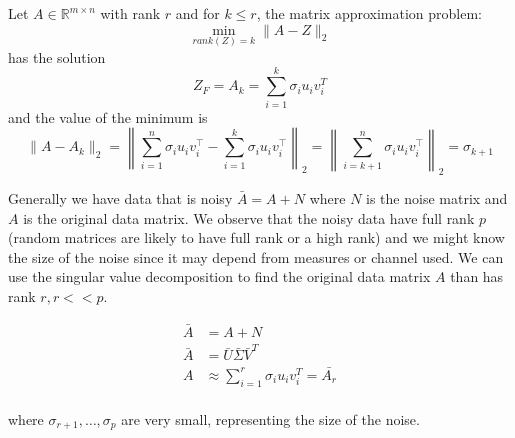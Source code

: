 Let $A \in \mathbb{R}^{m \times n}$ with rank $r$ and for $k \leq r$, the matrix approximation problem:
\[
\min_{rank(Z)=k} \|A-Z\|_2
\]
has the solution $$Z_F = A_k = \sum_{i=1}^k \sigma_i u_i v_i^T$$ and the value of the minimum is
\[
    \|A-A_{k}\|_{2}=\left\|\sum _{i=1}^{n}\sigma _{i}u_{i}v_{i}^{\top }-\sum _{i=1}^{k}\sigma _{i}u_{i}v_{i}^{\top }\right\|_{2}=\left\|\sum _{i=k+1}^{n}\sigma _{i}u_{i}v_{i}^{\top }\right\|_{2}=\sigma _{k+1}
\]

Generally we have data that is noisy $\bar{A} = A + N$ where $N$ is the noise matrix and $A$ is the original data matrix.
We observe that the noisy data have full rank $p$ (random matrices are likely to have full rank or a high rank)
and we might know the size of the noise since it may depend from measures or
channel used. We can use the singular value decomposition to find the original data matrix $A$ than has rank $r, r << p$.

\[
\begin{aligned}
\bar{A} &= A + N \\
\bar{A} &= \bar{U}\bar{\Sigma}\bar{V}^T \\
A &\approx \sum_{i=1}^r \sigma_i u_i v_i^T = \bar{A_r} \\
\end{aligned}
\]

where $\sigma_{r+1}, \ldots, \sigma_p$ are very small, representing the size of the noise.


